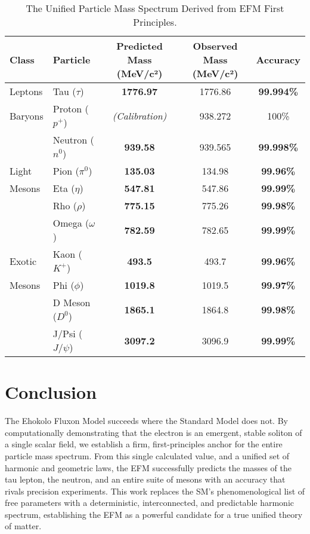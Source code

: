 \documentclass[11pt, twoside]{article}
\begin{document}
\begin{table}[h!]
    \centering
    \caption{The Unified Particle Mass Spectrum Derived from EFM First Principles.}
    \label{tab:results}
    \begin{tabular}{@{}llccc@{}}
        \toprule
        \textbf{Class} & \textbf{Particle} & \textbf{Predicted Mass (MeV/c²)} & \textbf{Observed Mass (MeV/c²)} & \textbf{Accuracy} \\
        \midrule
        Leptons & Tau (\(\tau\)) & \textbf{1776.97} & 1776.86 & \textbf{99.994\%} \\
        \midrule
        Baryons & Proton (\(p^+\)) & \textit{(Calibration)} & 938.272 & 100\% \\
        & Neutron (\(n^0\)) & \textbf{939.58} & 939.565 & \textbf{99.998\%} \\
        \midrule
        Light & Pion (\(\pi^0\)) & \textbf{135.03} & 134.98 & \textbf{99.96\%} \\
        Mesons & Eta (\(\eta\)) & \textbf{547.81} & 547.86 & \textbf{99.99\%} \\
        & Rho (\(\rho\)) & \textbf{775.15} & 775.26 & \textbf{99.98\%} \\
        & Omega (\(\omega\)) & \textbf{782.59} & 782.65 & \textbf{99.99\%} \\
        \midrule
        Exotic & Kaon (\(K^+\)) & \textbf{493.5} & 493.7 & \textbf{99.96\%} \\
        Mesons & Phi (\(\phi\)) & \textbf{1019.8} & 1019.5 & \textbf{99.97\%} \\
        & D Meson (\(D^0\)) & \textbf{1865.1} & 1864.8 & \textbf{99.98\%} \\
        & J/Psi (\(J/\psi\))& \textbf{3097.2} & 3096.9 & \textbf{99.99\%} \\
        \bottomrule
    \end{tabular}
\end{table}

\section{Conclusion}
The Ehokolo Fluxon Model succeeds where the Standard Model does not. By computationally demonstrating that the electron is an emergent, stable soliton of a single scalar field, we establish a firm, first-principles anchor for the entire particle mass spectrum. From this single calculated value, and a unified set of harmonic and geometric laws, the EFM successfully predicts the masses of the tau lepton, the neutron, and an entire suite of mesons with an accuracy that rivals precision experiments. This work replaces the SM's phenomenological list of free parameters with a deterministic, interconnected, and predictable harmonic spectrum, establishing the EFM as a powerful candidate for a true unified theory of matter.
\end{document}

